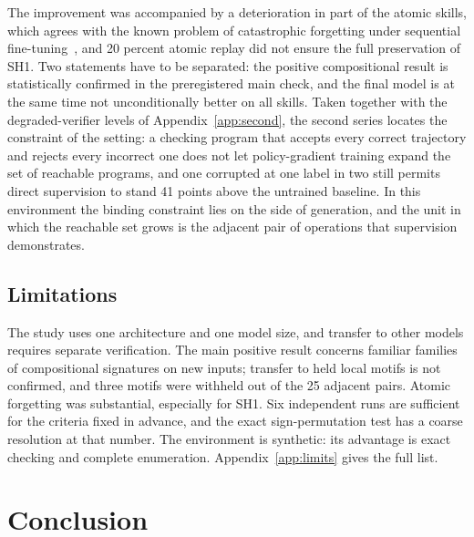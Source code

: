 \documentclass{zapiski}
\begin{document}
The improvement was accompanied by a deterioration in part of the atomic skills, which
agrees with the known problem of catastrophic forgetting under sequential
fine-tuning~\cite{kirkpatrick2017forgetting}, and 20 percent atomic replay did not
ensure the full preservation of SH1. Two statements have to be separated: the positive
compositional result is statistically confirmed in the preregistered main check, and
the final model is at the same time not unconditionally better on all skills. Taken
together with the degraded-verifier levels of Appendix~\ref{app:second}, the second
series locates the constraint of the setting: a checking program that accepts every
correct trajectory and rejects every incorrect one does not let policy-gradient
training expand the set of reachable programs, and one corrupted at one label in two
still permits direct supervision to stand 41 points above the untrained baseline. In this
environment the binding constraint lies on the side of generation, and the unit in
which the reachable set grows is the adjacent pair of operations that supervision
demonstrates.

\subsection{Limitations}

The study uses one architecture and one model size, and transfer to other models
requires separate verification. The main positive result concerns familiar families of
compositional signatures on new inputs; transfer to held local motifs is not confirmed,
and three motifs were withheld out of the 25 adjacent pairs. Atomic forgetting was
substantial, especially for SH1. Six independent runs are sufficient for the criteria
fixed in advance, and the exact sign-permutation test has a coarse resolution at that
number. The environment is synthetic: its advantage is exact checking and complete
enumeration. Appendix~\ref{app:limits} gives the full list.

\section{Conclusion}
\label{sec:conclusion}
\end{document}
